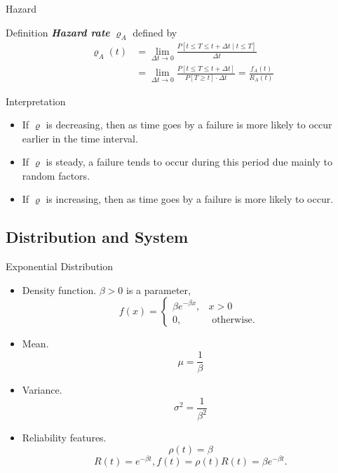 \documentclass{beamer}
\newcommand{\bb}[1]{\textcolor{antiquefuchsia}{\textbf{\textit{#1}}}}
\begin{document}
\begin{frame}{Hazard}
\begin{block}{Definition}
\bb{Hazard rate} $\varrho_{A}$ defined by
$$
\begin{aligned}
\varrho_{A}(t) &=\lim _{\Delta t \rightarrow 0} \frac{P[t \leq T \leq t+\Delta t \mid t \leq T]}{\Delta t} \\
&=\lim _{\Delta t \rightarrow 0} \frac{P[t \leq T \leq t+\Delta t]}{P[T \geq t] \cdot \Delta t}=\frac{f_{A}(t)}{R_{A}(t)}
\end{aligned}
$$
\end{block}
\begin{block}{Interpretation}
\begin{itemize}
\item If $\varrho$ is decreasing, then as time goes by a failure is more likely to occur earlier in the time interval.
\item If $\varrho$ is steady, a failure tends to occur during this period due mainly to random factors.
\item If $\varrho$ is increasing, then as time goes by a failure is more likely to occur.
\end{itemize}
\end{block}
\end{frame}


\subsection{Distribution and System}
\begin{frame}{Exponential Distribution}
\begin{itemize}
\item Density function. $\beta>0$ is a parameter,
$$
f(x)= \begin{cases}\beta e^{-\beta x}, & x>0 \\ 0, & \text { otherwise. }\end{cases}
$$
\item Mean.
$$
\mu=\frac{1}{\beta}
$$
\item Variance.
$$
\sigma^{2}=\frac{1}{\beta^{2}}
$$
\item Reliability features.
$$
\rho(t)=\beta$$$$R(t)=e^{-\beta t}, f(t)=\rho(t) R(t)=\beta e^{-\beta t} .
$$
\end{itemize}
\end{frame}
\end{document}
